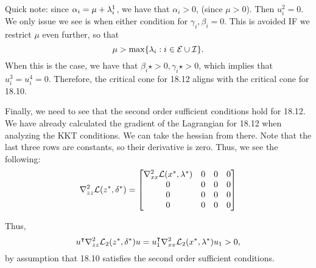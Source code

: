 \begin{solution}
    Quick note: since $\alpha_i = \mu + \mathrm{\lambda}_i^1$, we have that $\alpha_i > 0$, (since $\mu > 0$). Then $u_i^2 = 0$. We only issue we see is when either condition for $\gamma_i, \beta_i = 0$. This is avoided IF we restrict $\mu$ even further, so that 
    \[\mu > \max\{ \mathrm{\lambda}_i : i \in \mathcal{E} \cup \mathcal{I}\}.\]
    When this is the case, we have that $\beta_i\star > 0, \gamma_i\star > 0$, which implies that $u_i^3 = u_i^4 = 0$. Therefore, the critical cone for 18.12 aligns with the critical cone for 18.10.

    \newpage
    Finally, we need to see that the second order sufficient conditions hold for 18.12. We have already calculated the gradient of the Lagrangian for 18.12 when analyzing the KKT conditions. We can take the hessian from there. Note that the last three rows are constants, so their derivative is zero. Thus, we see the following:
\[
\grad_{zz}^2 \scL(z\star, \delta\star) = \mqty[
    \grad_{xx}^2\scL(x\star, \lm\star) & 0 & 0 & 0 \\
    0 & 0 & 0 & 0 \\
    0 & 0 & 0 & 0 \\
    0 & 0 & 0 & 0
]
\]

    Thus, 
    \[u^{\intercal}\nabla^2_{zz}\mathcal{L}_2(z^{*}, \delta^{*}) u = u_1^{\intercal}\nabla^2_{xx}\mathcal{L}_2(x^{*}, \mathrm{\lambda}^{*}) u_1 > 0,\]
    by assumption that 18.10 satisfies the second order sufficient conditions. 
\end{solution}

